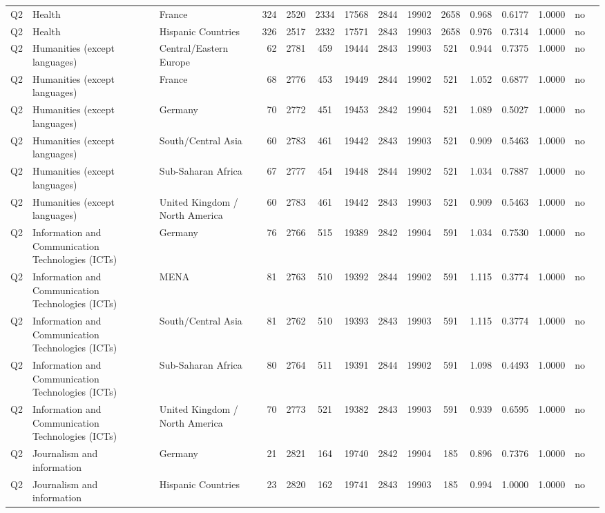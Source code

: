 \begin{longtable}{lllrcccccccccll}
Q2 & Health & France & 324 & 2520 & 2334 & 17568 & 2844 & 19902 & 2658 & 0.968 & 0.6177 & 1.0000 & no \\
Q2 & Health & Hispanic Countries & 326 & 2517 & 2332 & 17571 & 2843 & 19903 & 2658 & 0.976 & 0.7314 & 1.0000 & no \\
Q2 & Humanities (except languages) & Central/Eastern Europe & 62 & 2781 & 459 & 19444 & 2843 & 19903 & 521 & 0.944 & 0.7375 & 1.0000 & no \\
Q2 & Humanities (except languages) & France & 68 & 2776 & 453 & 19449 & 2844 & 19902 & 521 & 1.052 & 0.6877 & 1.0000 & no \\
Q2 & Humanities (except languages) & Germany & 70 & 2772 & 451 & 19453 & 2842 & 19904 & 521 & 1.089 & 0.5027 & 1.0000 & no \\
Q2 & Humanities (except languages) & South/Central Asia & 60 & 2783 & 461 & 19442 & 2843 & 19903 & 521 & 0.909 & 0.5463 & 1.0000 & no \\
Q2 & Humanities (except languages) & Sub-Saharan Africa & 67 & 2777 & 454 & 19448 & 2844 & 19902 & 521 & 1.034 & 0.7887 & 1.0000 & no \\
Q2 & Humanities (except languages) & United Kingdom / North America & 60 & 2783 & 461 & 19442 & 2843 & 19903 & 521 & 0.909 & 0.5463 & 1.0000 & no \\
Q2 & Information and Communication Technologies (ICTs) & Germany & 76 & 2766 & 515 & 19389 & 2842 & 19904 & 591 & 1.034 & 0.7530 & 1.0000 & no \\
Q2 & Information and Communication Technologies (ICTs) & MENA & 81 & 2763 & 510 & 19392 & 2844 & 19902 & 591 & 1.115 & 0.3774 & 1.0000 & no \\
Q2 & Information and Communication Technologies (ICTs) & South/Central Asia & 81 & 2762 & 510 & 19393 & 2843 & 19903 & 591 & 1.115 & 0.3774 & 1.0000 & no \\
Q2 & Information and Communication Technologies (ICTs) & Sub-Saharan Africa & 80 & 2764 & 511 & 19391 & 2844 & 19902 & 591 & 1.098 & 0.4493 & 1.0000 & no \\
Q2 & Information and Communication Technologies (ICTs) & United Kingdom / North America & 70 & 2773 & 521 & 19382 & 2843 & 19903 & 591 & 0.939 & 0.6595 & 1.0000 & no \\
Q2 & Journalism and information & Germany & 21 & 2821 & 164 & 19740 & 2842 & 19904 & 185 & 0.896 & 0.7376 & 1.0000 & no \\
Q2 & Journalism and information & Hispanic Countries & 23 & 2820 & 162 & 19741 & 2843 & 19903 & 185 & 0.994 & 1.0000 & 1.0000 & no \\

\end{longtable}
